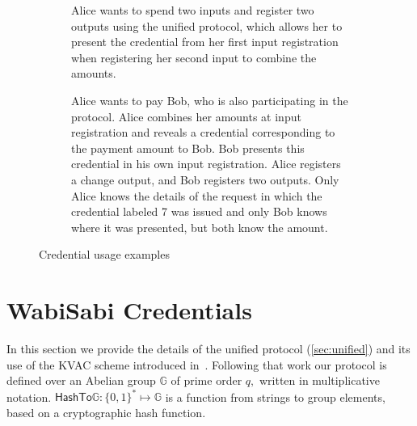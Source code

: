 \documentclass[a4paper]{article}
\begin{document}
\begin{figure}[h!]
\begin{subfigure}{.45\linewidth}
  \caption{Alice wants to spend two inputs and register two outputs using the unified protocol, which allows her to present the credential from her first input registration when registering her second input to combine the amounts.}
  \label{fig:ex3}
  \end{subfigure}
\begin{subfigure}{.45\linewidth}
  \centering
  \caption{Alice wants to pay Bob, who is also participating in the protocol. Alice combines her amounts at input registration and reveals a credential corresponding to the payment amount to Bob. Bob presents this credential in his own input registration. Alice registers a change output, and Bob registers two outputs. Only Alice knows the details of the request in which the credential labeled 7 was issued and only Bob knows where it was presented, but both know the amount.}
  \label{fig:ex4}
  \end{subfigure}
  \caption{Credential usage examples}
\end{figure}

\section{WabiSabi Credentials}\label{sec:details}

In this section we provide the details of the unified protocol (\cref{sec:unified}) and its use of the KVAC scheme introduced in~\cite{chase2019signal}. Following that work our protocol is defined over an Abelian group \(\mathbb{G}\) of prime order \(q,\) written in multiplicative notation.
$\mathsf{HashTo\mathbb{G}} : \{0,1\}^{*} \mapsto \mathbb{G}$ is a function from strings to group elements, based on a cryptographic hash function\cite{fouque2012indifferentiable}.
\end{document}
